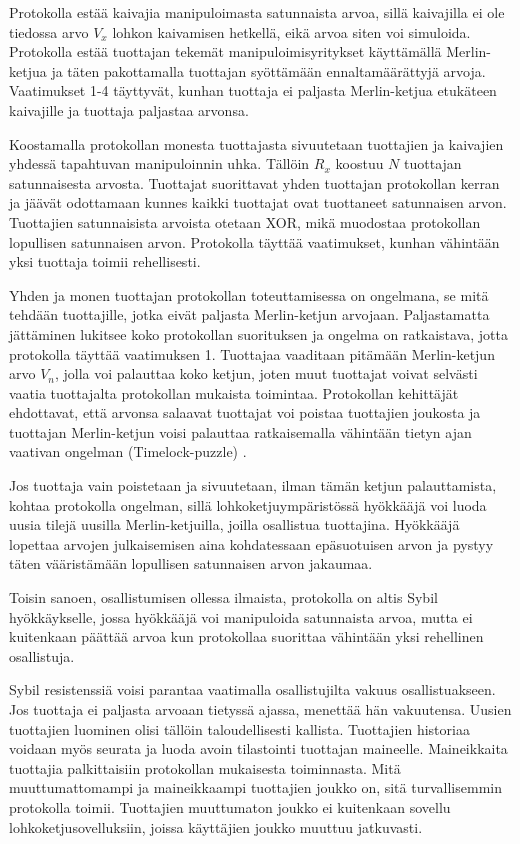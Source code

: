 Protokolla estää kaivajia manipuloimasta satunnaista arvoa, sillä kaivajilla ei ole tiedossa arvo $V_x$ lohkon kaivamisen hetkellä, eikä arvoa siten voi simuloida. Protokolla estää tuottajan tekemät manipuloimisyritykset käyttämällä Merlin-ketjua ja täten pakottamalla tuottajan syöttämään ennaltamäärättyjä arvoja. Vaatimukset 1-4 täyttyvät, kunhan tuottaja ei paljasta Merlin-ketjua etukäteen kaivajille ja tuottaja paljastaa arvonsa. 

Koostamalla protokollan monesta tuottajasta sivuutetaan tuottajien ja kaivajien yhdessä tapahtuvan manipuloinnin uhka. Tällöin $R_x$ koostuu $N$ tuottajan satunnaisesta arvosta. Tuottajat suorittavat yhden tuottajan protokollan kerran ja jäävät odottamaan kunnes kaikki tuottajat ovat tuottaneet satunnaisen arvon. Tuottajien satunnaisista arvoista otetaan XOR, mikä muodostaa protokollan lopullisen satunnaisen arvon. Protokolla täyttää vaatimukset, kunhan vähintään yksi tuottaja toimii rehellisesti.

Yhden ja monen tuottajan protokollan toteuttamisessa on ongelmana, se mitä tehdään tuottajille, jotka eivät paljasta Merlin-ketjun arvojaan. Paljastamatta jättäminen lukitsee koko protokollan suorituksen ja ongelma on ratkaistava, jotta protokolla täyttää vaatimuksen 1. Tuottajaa vaaditaan pitämään Merlin-ketjun arvo $V_n$, jolla voi palauttaa koko ketjun, joten muut tuottajat voivat selvästi vaatia tuottajalta protokollan mukaista toimintaa. Protokollan kehittäjät ehdottavat, että arvonsa salaavat tuottajat voi poistaa tuottajien joukosta ja tuottajan Merlin-ketjun voisi palauttaa ratkaisemalla vähintään tietyn ajan vaativan ongelman (Timelock-puzzle) \cite{MerlinChains}.

Jos tuottaja vain poistetaan ja sivuutetaan, ilman tämän ketjun palauttamista, kohtaa protokolla ongelman, sillä lohkoketjuympäristössä hyökkääjä voi luoda uusia tilejä uusilla Merlin-ketjuilla, joilla osallistua tuottajina. Hyökkääjä lopettaa arvojen julkaisemisen aina kohdatessaan epäsuotuisen arvon ja pystyy täten vääristämään lopullisen satunnaisen arvon jakaumaa. 

Toisin sanoen, osallistumisen ollessa ilmaista, protokolla on altis Sybil hyökkäykselle, jossa hyökkääjä voi manipuloida satunnaista arvoa, mutta ei kuitenkaan päättää arvoa kun protokollaa suorittaa vähintään yksi rehellinen osallistuja.

Sybil resistenssiä voisi parantaa vaatimalla osallistujilta vakuus osallistuakseen. Jos tuottaja ei paljasta arvoaan tietyssä ajassa, menettää hän vakuutensa. Uusien tuottajien luominen olisi tällöin taloudellisesti kallista. Tuottajien historiaa voidaan myös seurata ja luoda avoin tilastointi tuottajan maineelle. Maineikkaita tuottajia palkittaisiin protokollan mukaisesta toiminnasta. Mitä muuttumattomampi ja maineikkaampi tuottajien joukko on, sitä turvallisemmin protokolla toimii. Tuottajien muuttumaton joukko ei kuitenkaan sovellu lohkoketjusovelluksiin, joissa käyttäjien joukko muuttuu jatkuvasti. 

